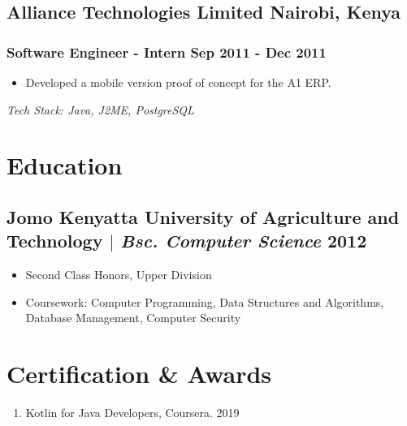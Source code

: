 \documentclass[11pt]{article} %
\newcommand \techstack [1]
    {\small\textit{Tech Stack: {#1}}} %
\begin{document}
\subsection{Alliance Technologies Limited \hfill Nairobi, Kenya}
\subsubsection{Software Engineer - Intern \hfill  Sep 2011 - Dec 2011}
\begin{itemize}
    \item Developed a mobile version proof of concept for the A1 ERP. 
\end{itemize}
\techstack{Java, J2ME, PostgreSQL}

\section{Education}
\subsection{Jomo Kenyatta University of Agriculture and Technology $|$ {\normalfont\itshape Bsc. Computer Science} \hfill 2012}
\begin{itemize}
    \item Second Class Honors, Upper Division
    \item Coursework: Computer Programming, Data Structures and Algorithms, Database Management, Computer Security
\end{itemize}


\section{Certification \& Awards}
\begin{enumerate}[label=\null, left=0pt..0pt, itemsep=0pt]
    \item Kotlin for Java Developers, Coursera. \hfill 2019
\end{enumerate}
\end{document}
